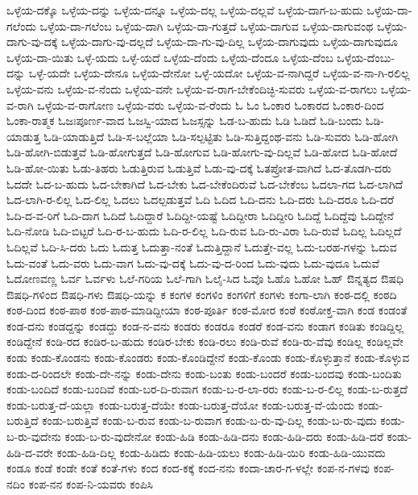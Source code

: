 ಒಳ್ಳೆಯ-ದಕ್ಕೊ
ಒಳ್ಳೆಯ-ದನ್ನು
ಒಳ್ಳೆಯ-ದನ್ನೂ
ಒಳ್ಳೆಯ-ದಲ್ಲ
ಒಳ್ಳೆಯ-ದಲ್ಲವೆ
ಒಳ್ಳೆಯ-ದಾಗ-ಬ-ಹುದು
ಒಳ್ಳೆಯ-ದಾ-ಗಲೆಂದು
ಒಳ್ಳೆಯ-ದಾ-ಗಲೆಂಬ
ಒಳ್ಳೆಯ-ದಾಗಿ
ಒಳ್ಳೆಯ-ದಾ-ಗುತ್ತದೆ
ಒಳ್ಳೆಯ-ದಾಗುವ
ಒಳ್ಳೆಯ-ದಾಗುವಂಥ
ಒಳ್ಳೆಯ-ದಾಗು-ವು-ದಕ್ಕೆ
ಒಳ್ಳೆಯ-ದಾಗು-ವು-ದಲ್ಲದೆ
ಒಳ್ಳೆಯ-ದಾ-ಗು-ವು-ದಿಲ್ಲ
ಒಳ್ಳೆಯ-ದಾಗುವುದು
ಒಳ್ಳೆಯ-ದಾಗುವುದೂ
ಒಳ್ಳೆಯ-ದಾ-ಯಿತು
ಒಳ್ಳೆ-ಯದು
ಒಳ್ಳೆ-ಯದೆ
ಒಳ್ಳೆಯ-ದೆಂದು
ಒಳ್ಳೆಯ-ದೆಂದೂ
ಒಳ್ಳೆಯ-ದೆಂಬ
ಒಳ್ಳೆಯ-ದೆಂಬು-ದನ್ನು
ಒಳ್ಳೆ-ಯದೇ
ಒಳ್ಳೆಯ-ದೇನೂ
ಒಳ್ಳೆಯ-ದೇನೋ
ಒಳ್ಳೆ-ಯದೋ
ಒಳ್ಳೆಯ-ವ-ನಾಗಿದ್ದರೆ
ಒಳ್ಳೆಯ-ವ-ನಾ-ಗಿ-ರಲಿಲ್ಲ
ಒಳ್ಳೆಯ-ವನು
ಒಳ್ಳೆಯ-ವ-ನೆಂದು
ಒಳ್ಳೆಯ-ವನೇ
ಒಳ್ಳೆಯ-ವ-ರಾಗ-ಬೇಕೆಂದಿಚ್ಛಿ-ಸುವರು
ಒಳ್ಳೆಯ-ವ-ರಾಗಲು
ಒಳ್ಳೆಯ-ವ-ರಾಗಿ
ಒಳ್ಳೆಯ-ವ-ರಾಗೋಣ
ಒಳ್ಳೆಯ-ವರು
ಒಳ್ಳೆಯ-ವ-ರೆಂದು
ಓ
ಓಂ
ಓಂಕಾರ
ಓಂಕಾರದ
ಓಂಕಾರ-ದಿಂದ
ಓಂಕಾ-ರಾತ್ಮಕ
ಓಜಃಪೂರ್ಣ-ವಾದ
ಓಜಸ್ವಿ-ಯಾದ
ಓಜಸ್ಸನ್ನು
ಓಡ-ಬ-ಹುದು
ಓಡಿ
ಓಡಿದೆ
ಓಡಿ-ಬಂದು
ಓಡಿ-ಯಾಡುತ್ತ
ಓಡಿ-ಯಾಡುತ್ತಿದೆ
ಓಡಿ-ಸ-ಬಲ್ಲೆಯಾ
ಓಡಿ-ಸಲ್ಪಟ್ಟಿತು
ಓಡಿ-ಸುತ್ತಿದ್ದಂಥ-ವನು
ಓಡಿ-ಸುವರು
ಓಡಿ-ಹೋಗಿ
ಓಡಿ-ಹೋಗಿ-ಬಿಡುತ್ತವೆ
ಓಡಿ-ಹೋಗುತ್ತದೆ
ಓಡಿ-ಹೋಗುವ
ಓಡಿ-ಹೋಗು-ವು-ದಿಲ್ಲವೆ
ಓಡಿ-ಹೋದ
ಓಡಿ-ಹೋದೆ
ಓಡಿ-ಹೋ-ಯಿತು
ಓಡು-ತಿಹರು
ಓಡುತ್ತಿರುವ
ಓಡುತ್ತಿವೆ
ಓಡು-ವು-ದಕ್ಕೆ
ಓತಪ್ರೋತ-ವಾಗಿದೆ
ಓದ-ತೊಡಗಿ-ದರು
ಓದದೇ
ಓದ-ಬ-ಹುದು
ಓದ-ಬೇಕಾಗಿದೆ
ಓದ-ಬೇಕು
ಓದ-ಬೇಕೆಂದಿರುವೆ
ಓದ-ಬೇಕೆಂಬ
ಓದಲಾ-ಗದ
ಓದ-ಲಾಗಿದೆ
ಓದ-ಲಾಗಿ-ರ-ಲಿಲ್ಲ
ಓದ-ಲಿಲ್ಲ
ಓದಲು
ಓದಲ್ಪಡುತ್ತವೆ
ಓದಿ
ಓದಿದ
ಓದಿ-ದನು
ಓದಿ-ದರು
ಓದಿ-ದರೂ
ಓದಿ-ದರೆ
ಓದಿ-ದ-ವ-ರಿಗೆ
ಓದಿ-ದಾಗ
ಓದಿದೆ
ಓದಿದ್ದಾರೆ
ಓದಿದ್ದೀ-ಯಷ್ಟೆ
ಓದಿದ್ದೀರಾ
ಓದಿದ್ದೀರಿ
ಓದಿದ್ದೆ
ಓದಿದ್ದೆವು
ಓದಿದ್ದೇನೆ
ಓದಿ-ನೋಡಿ
ಓದಿ-ಬಿಟ್ಟರೆ
ಓದಿ-ರ-ಬ-ಹುದು
ಓದಿ-ರ-ಲಿಲ್ಲ
ಓದಿ-ರುವ
ಓದಿ-ರು-ವಿರಾ
ಓದಿ-ರುವೆ
ಓದಿಲ್ಲ
ಓದಿಲ್ಲದೆ
ಓದಿಲ್ಲವೆ
ಓದಿ-ಸಿ-ದರು
ಓದು
ಓದುತ್ತ
ಓದುತ್ತಾ-ನಂತೆ
ಓದುತ್ತಿದ್ದಾನೆ
ಓದುತ್ತೇ-ವಲ್ಲ
ಓದು-ಬರಹ-ಗಳನ್ನು
ಓದುವ
ಓದು-ವಂತೆ
ಓದು-ವರು
ಓದು-ವಾಗ
ಓದು-ವು-ದಕ್ಕೆ
ಓದು-ವು-ದ-ರಿಂದ
ಓದು-ವುದು
ಓದು-ವುದೂ
ಓದುವೆ
ಓದೋಣವಣ್ಣ
ಓರ್ವ
ಓರ್ವಳು
ಓಲೆ-ಗರಿಯ
ಓಲೆ-ಗಾಗಿ
ಓಲೈ-ಸಿದ
ಓವೊ
ಓಹೊ
ಓಹೋ
ಓಹ್
ಔನ್ನತ್ಯದ
ಔಷಧಿ
ಔಷಧಿ-ಗಳಿಂದ
ಔಷಧಿ-ಗಳು
ಔಷಧಿ-ಯನ್ನು
ಕ
ಕಂಗಳ
ಕಂಗಳಿಂ
ಕಂಗಳಿಗೆ
ಕಂಗಳು
ಕಂಗಾ-ಲಾಗಿ
ಕಂಠ-ದಲ್ಲಿ
ಕಂಠದಿ
ಕಂಠ-ದಿಂದ
ಕಂಠ-ಪಾಠ
ಕಂಠ-ಪಾಠ-ಮಾಡಿದ್ದೀಯಾ
ಕಂಠ-ಪೂರ್ತಿ
ಕಂಠ-ಮೋರ
ಕಂಠೆ
ಕಂಠೋಕ್ತ-ವಾಗಿ
ಕಂಡ
ಕಂಡಂತೆ
ಕಂಡ-ದನು
ಕಂಡದ್ದನ್ನು
ಕಂಡದ್ದು
ಕಂಡ-ನ-ವನು
ಕಂಡರು
ಕಂಡರೂ
ಕಂಡರೆ
ಕಂಡ-ವನು
ಕಂಡಾಗ
ಕಂಡಿತು
ಕಂಡಿದ್ದಿಲ್ಲ
ಕಂಡಿದ್ದೇನೆ
ಕಂಡಿ-ರದ
ಕಂಡಿರ-ಬ-ಹುದು
ಕಂಡಿರ-ಬೇಕು
ಕಂಡಿ-ರಲು
ಕಂಡಿ-ರುವೆ
ಕಂಡಿ-ರು-ವೆವು
ಕಂಡಿಲ್ಲ
ಕಂಡಿಲ್ಲವೇ
ಕಂಡು
ಕಂಡು-ಕೊಂಡನು
ಕಂಡು-ಕೊಂಡರು
ಕಂಡು-ಕೊಂಡಿದ್ದೇನೆ
ಕಂಡು-ಕೊಂಡು
ಕಂಡು-ಕೊಳ್ಳುತ್ತಾನೆ
ಕಂಡು-ಕೊಳ್ಳುವ
ಕಂಡು-ದ-ರಿಂದಲೇ
ಕಂಡು-ದೇ-ನನ್ನು
ಕಂಡು-ದೇನು
ಕಂಡು-ಬಂತು
ಕಂಡು-ಬಂದರೆ
ಕಂಡು-ಬಂದವು
ಕಂಡು-ಬಂದಿತು
ಕಂಡು-ಬಂದಿದೆ
ಕಂಡು-ಬಂದಿವೆ
ಕಂಡು-ಬರ-ದಿ-ರುವಾಗ
ಕಂಡು-ಬ-ರ-ಲಾ-ರರು
ಕಂಡು-ಬ-ರ-ಲಿಲ್ಲ
ಕಂಡು-ಬ-ರುತ್ತದೆ
ಕಂಡು-ಬರುತ್ತ-ದೆ-ಯಲ್ಲಾ
ಕಂಡು-ಬರುತ್ತ-ದೆಯೇ
ಕಂಡು-ಬರುತ್ತ-ದೆಯೋ
ಕಂಡು-ಬರುತ್ತ-ವೆ-ಯೆಂದು
ಕಂಡು-ಬರುತ್ತಿದೆ
ಕಂಡು-ಬರುತ್ತಿವೆ
ಕಂಡು-ಬ-ರುವ
ಕಂಡು-ಬ-ರುವಾಗ
ಕಂಡು-ಬ-ರು-ವು-ದಿಲ್ಲ
ಕಂಡು-ಬ-ರು-ವುದು
ಕಂಡು-ಬ-ರು-ವುದೇನು
ಕಂಡು-ಬ-ರು-ವುದೇನೋ
ಕಂಡು-ಹಿಡಿ
ಕಂಡು-ಹಿಡಿ-ದನು
ಕಂಡು-ಹಿಡಿ-ದರು
ಕಂಡು-ಹಿಡಿ-ದರೆ
ಕಂಡು-ಹಿಡಿ-ದ-ವರೇ
ಕಂಡು-ಹಿಡಿ-ದಿಲ್ಲ
ಕಂಡು-ಹಿಡಿದು
ಕಂಡು-ಹಿಡಿ-ಯಲು
ಕಂಡು-ಹಿಡಿ-ಯಿರಿ
ಕಂಡು-ಹಿಡಿ-ಯುವದು
ಕಂಡೂ
ಕಂಡೆ
ಕಂಡೇ
ಕಂತೆ
ಕಂತೆ-ಗಳು
ಕಂದ
ಕಂದ-ಕಕ್ಕೆ
ಕಂದ-ನನು
ಕಂದಾ-ಚಾರ-ಗ-ಳಲ್ಲೇ
ಕಂಪ-ನ-ಗಳವು
ಕಂಪ-ನದಿಂ
ಕಂಪ-ನನ
ಕಂಪ-ನಿ-ಯವರು
ಕಂಪಿಸಿ
